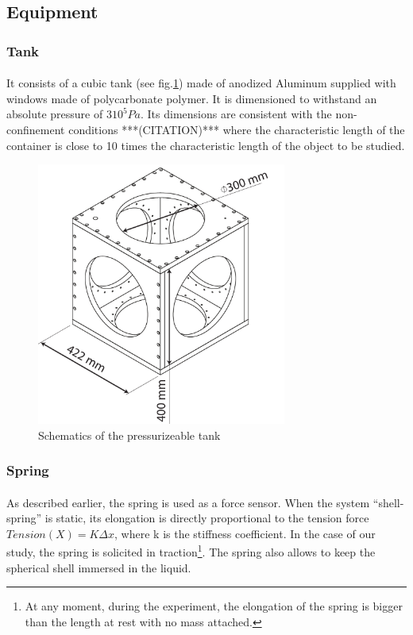 \subsection{Equipment}
\subsubsection{Tank}
\paragraph{}
It consists of a cubic tank (see fig.\ref{fig:tank}) made of anodized Aluminum supplied with windows made of polycarbonate polymer. It is dimensioned to withstand an absolute pressure of $3 10^5 Pa$. Its dimensions are consistent with the non-confinement conditions ***(CITATION)*** where the characteristic length of the container is close to 10 times the characteristic length of the object to be studied.
\begin{figure}[H] %
	\centering%
  \includegraphics[width=0.73\textwidth]{figures/Chapter_1/cuve.pdf}
	\caption{Schematics of the pressurizeable tank}
	\label{fig:tank}
\end{figure}
\subsubsection{Spring}
\paragraph{}
As described earlier, the spring is used as a force sensor. 
When the system "`shell-spring"' is static, its elongation is directly proportional to the tension force $Tension(X) = K \Delta x$, where k is the stiffness coefficient. In the case of our study, the spring is solicited in traction\footnote{At any moment, during the experiment, the elongation of the spring is bigger than the length at rest with no mass attached.}. 
The spring also allows to keep the spherical shell immersed in the liquid.
